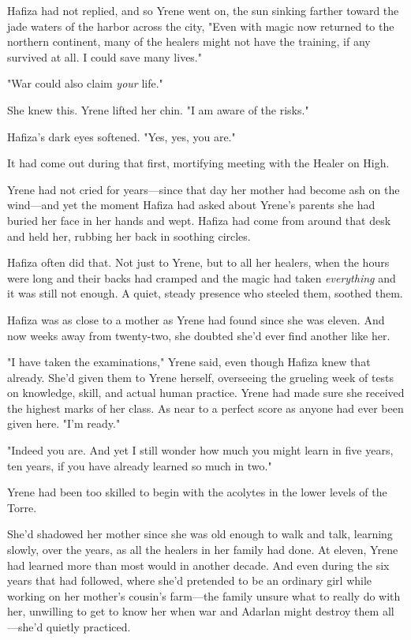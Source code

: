 Hafiza had not replied, and so Yrene went on, the sun sinking farther toward the jade waters of the harbor across the city, "Even with magic now returned to the northern continent, many of the healers might not have the training, if any survived at all.
I could save many lives."

"War could also claim \emph{your} life."

She knew this.
Yrene lifted her chin.
"I am aware of the risks."

Hafiza's dark eyes softened.
"Yes, yes, you are."

It had come out during that first, mortifying meeting with the Healer on High.

Yrene had not cried for years---since that day her mother had become ash on the wind---and yet the moment Hafiza had asked about Yrene's parents she had buried her face in her hands and wept.
Hafiza had come from around that desk and held her, rubbing her back in soothing circles.

Hafiza often did that.
Not just to Yrene, but to all her healers, when the hours were long and their backs had cramped and the magic had taken \emph{everything} and it was still not enough.
A quiet, steady presence who steeled them, soothed them.

Hafiza was as close to a mother as Yrene had found since she was eleven.
And now weeks away from twenty-two, she doubted she'd ever find another like her.

"I have taken the examinations," Yrene said, even though Hafiza knew that already.
She'd given them to Yrene herself, overseeing the grueling week of tests on knowledge, skill, and actual human practice.
Yrene had made sure she received the highest marks of her class.
As near to a perfect score as anyone had ever been given here.
"I'm ready."

"Indeed you are.
And yet I still wonder how much you might learn in five years, ten years, if you have already learned so much in two."

Yrene had been too skilled to begin with the acolytes in the lower levels of the Torre.

She'd shadowed her mother since she was old enough to walk and talk, learning slowly, over the years, as all the healers in her family had done.
At eleven, Yrene had learned more than most would in another decade.
And even during the six years that had followed, where she'd pretended to be an ordinary girl while working on her mother's cousin's farm---the family unsure what to really do with her, unwilling to get to know her when war and Adarlan might destroy them all---she'd quietly practiced.

